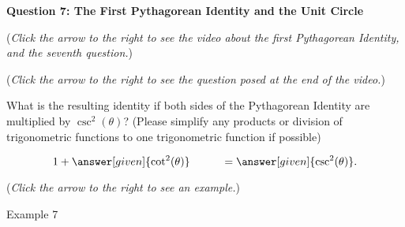 \documentclass{ximera}
\begin{document}
\textbf{Question 7: The First Pythagorean Identity and the Unit Circle}
\begin{question}
\begin{flushright}
{\color{blue}(\emph{Click the arrow to the right to see the
video about the first Pythagorean Identity, and the seventh question.})}
\end{flushright}
\begin{center}
\begin{expandable}
\begin{flushright}
{\color{blue}(\emph{Click the arrow to the right to see the question
posed at the end of the video.})}
\end{flushright}
\begin{expandable}
What is the resulting identity if both sides of the Pythagorean Identity are multiplied by $\csc^2(\theta)$? (Please simplify any products or division of trigonometric functions to one trigonometric function if possible)
\begin{prompt}
\[
1 + \answer[given]{\cot^2(\theta)} \hspace{1cm} = \answer[given]{\csc^2(\theta)}.
\]
\end{prompt}
\begin{flushright}
{\color{blue}(\emph{Click the arrow to the right to see an example.})}
\end{flushright}
\begin{expandable}
\begin{center}
Example 7
\end{center}
\end{expandable}
\end{expandable}
\end{expandable}
\end{center}
\end{question}
\end{document}
